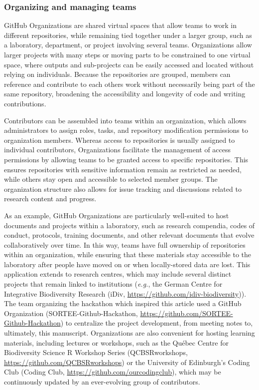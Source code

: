 \hypertarget{organizing-and-managing-teams}{%
\subsubsection{Organizing and managing teams}\label{organizing-and-managing-teams}}

GitHub Organizations are shared virtual spaces that allow teams to work in different repositories, while remaining tied together under a larger group, such as a laboratory, department, or project involving several teams.
Organizations allow larger projects with many steps or moving parts to be constrained to one virtual space, where outputs and sub-projects can be easily accessed and located without relying on individuals.
Because the repositories are grouped, members can reference and contribute to each others work without necessarily being part of the same repository, broadening the accessibility and longevity of code and writing contributions.

Contributors can be assembled into teams within an organization, which allows administrators to assign roles, tasks, and repository modification permissions to organization members.
Whereas access to repositories is usually assigned to individual contributors, Organizations facilitate the management of access permissions by allowing teams to be granted access to specific repositories.
This ensures repositories with sensitive information remain as restricted as needed, while others stay open and accessible to selected member groups.
The organization structure also allows for issue tracking and discussions related to research content and progress.

As an example, GitHub Organizations are particularly well-suited to host documents and projects within a laboratory, such as research compendia, codes of conduct, protocols, training documents, and other relevant documents that evolve collaboratively over time.
In this way, teams have full ownership of repositories within an organization, while ensuring that these materials stay accessible to the laboratory after people have moved on or when locally-stored data are lost.
This application extends to research centres, which may include several distinct projects that remain linked to institutions (\emph{e.g.}, the German Centre for Integrative Biodiversity Research (iDiv, \url{https://github.com/idiv-biodiversity})).
The team organizing the hackathon which inspired this article used a GitHub Organization (SORTEE-Github-Hackathon, \url{https://github.com/SORTEE-Github-Hackathon}) to centralize the project development, from meeting notes to, ultimately, this manuscript.
Organizations are also convenient for hosting learning materials, including lectures or workshops, such as the Québec Centre for Biodiversity Science R Workshop Series (QCBSRworkshops, \url{https://github.com/QCBSRworkshops}) or the University of Edinburgh's Coding Club (Coding Club, \url{https://github.com/ourcodingclub}), which may be continuously updated by an ever-evolving group of contributors.

